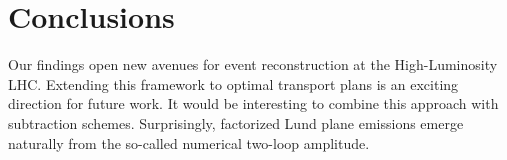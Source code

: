 \section{Conclusions}\label{sec:conclusions}

Our findings open new avenues for event reconstruction at the
High-Luminosity LHC. Extending this framework to optimal transport plans
is an exciting direction for future work. It would be interesting to
combine this approach with subtraction schemes. Surprisingly, factorized
Lund plane emissions emerge naturally from the so-called numerical
two-loop amplitude.

